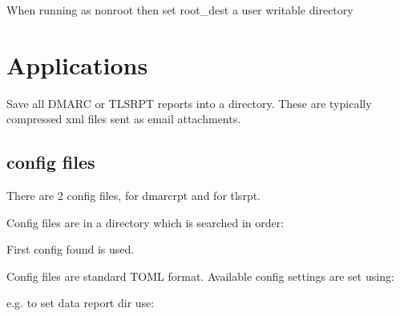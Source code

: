 \documentclass[letterpaper,10pt,english]{sphinxmanual}
\begin{document}
\sphinxAtStartPar
When running as non\sphinxhyphen{}root then set root\_dest a user writable directory


\section{Applications}
\label{\detokenize{README:applications}}
\sphinxAtStartPar
Save all DMARC or TLS\sphinxhyphen{}RPT reports into a directory. These are typically compressed xml files
sent as email attachments.


\subsection{config files}
\label{\detokenize{README:config-files}}
\sphinxAtStartPar
There are 2 config files,  for dmarc\sphinxhyphen{}rpt and  for tls\sphinxhyphen{}rpt.

\sphinxAtStartPar
Config files are in a directory which is searched in order:

\begin{sphinxVerbatim}[commandchars=\\\{\}]
\PYG{p}{[}\PYG{p}{]}
\PYG{p}{[}\PYG{p}{]}
\end{sphinxVerbatim}

\sphinxAtStartPar
First config found is used.

\sphinxAtStartPar
Config files are standard TOML format.  Available config settings are set using:

\begin{sphinxVerbatim}[commandchars=\\\{\}]
  
\end{sphinxVerbatim}

\sphinxAtStartPar
e.g. to set data report dir use:

\begin{sphinxVerbatim}[commandchars=\\\{\}]
  
\end{sphinxVerbatim}
\end{document}
